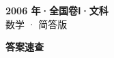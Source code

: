 \documentclass[zihao=-4, a4paper]{ctexart}
\begin{document}
\begin{center}
  {\Large\bfseries 2006 年·全国卷Ⅰ·文科}\\[4pt]
  {\large 数学 · 简答版}
\end{center}
\medskip
{}

\clearpage
{}
\begin{center}{\Large\bfseries 答案速查}\end{center}
\medskip

\end{document}
